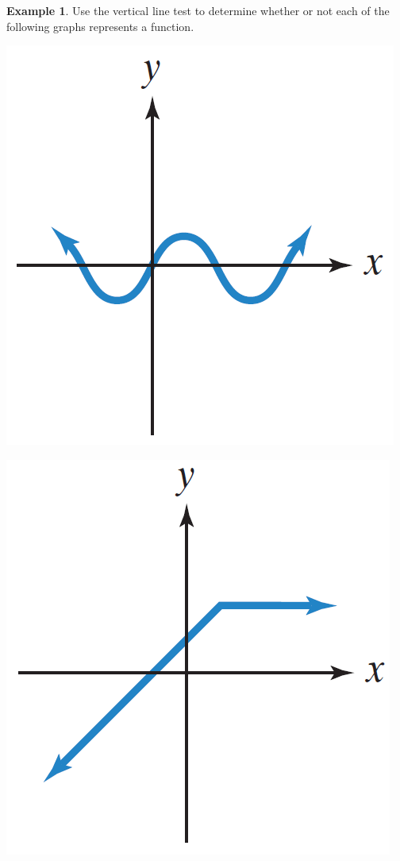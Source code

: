 \documentclass[addpoints,12pt]{exam}
\theoremstyle{definition}
\newtheorem{example}{Example}[subsection]
\begin{document}
\begin{example}
Use the vertical line test to determine whether or not each of the following graphs represents a function. 

\begin{minipage}{.33\textwidth}
\includegraphics[scale=.4]{images/vert_line_test_01}
\end{minipage}%
\begin{minipage}{.33\textwidth}
\includegraphics[scale=.4]{images/vert_line_test_02}

\end{minipage}
\end{example}
\end{document}
